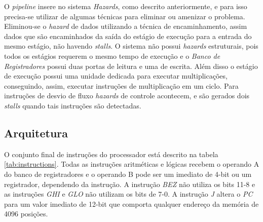 \documentclass[11pt,a4paper,titlepage]{article}
\begin{document}
O \textit{pipeline} insere no sistema \textit{Hazards}, como descrito anteriormente, e para isso precisa-se utilizar de algumas técnicas para eliminar ou amenizar o problema. Eliminou-se o \textit{hazard} de dados utilizando a técnica de encaminhamento, assim dados que são encaminhados da saída do estágio de execução para a entrada do mesmo estágio, não havendo \textit{stalls}. O sistema não possui \textit{hazards} estruturais, pois todos os estágios requerem o mesmo tempo de execução e o \textit{Banco de Registradores} possui duas portas de leitura e uma de escrita. Além disso o estágio de execução possui uma unidade dedicada para executar multiplicações, conseguindo, assim, executar instruções de multiplicação em um ciclo. Para instruções de desvio de fluxo \textit{hazards} de controle acontecem, e são gerados dois \textit{stalls} quando tais instruções são detectadas.

\subsection{Arquitetura}

O conjunto final de instruções do processador está descrito na tabela \ref{tab:instructions}. Todas as instruções aritméticas e lógicas recebem o operando A do banco de registradores e o operando B pode ser um imediato de 4-bit ou um registrador, dependendo da instrução. A instrução \textit{BEZ} não utiliza os bits 11-8 e as instruções \textit{GHI} e \textit{GLO} não utilizam os bits de 7-0. A instrução \textit{J} altera o \textit{PC} para um valor imediato de 12-bit que comporta qualquer endereço da memória de 4096 posições.
\end{document}
